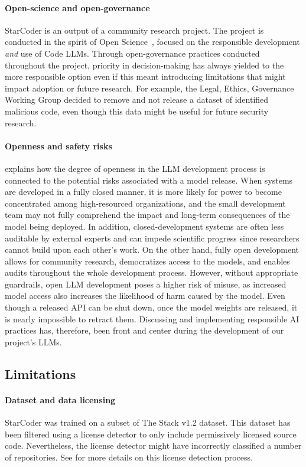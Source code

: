 \paragraph{Open-science and open-governance} StarCoder is an output of a community research project. The project is conducted in the spirit of Open Science~\citep{open-science}, focused on the responsible development \emph{and} use of Code LLMs. Through open-governance practices conducted throughout the project, priority in decision-making has always yielded to the more responsible option even if this meant introducing limitations that might impact adoption or future research. For example, the Legal, Ethics, Governance Working Group decided to remove and not release a dataset of identified malicious code, even though this data might be useful for future security research.

\paragraph{Openness and safety risks}
\citet{solaiman2023gradient} explains how the degree of openness in the LLM development process is connected to the potential risks associated with a model release. When systems are developed in a fully closed manner, it is more likely for power to become concentrated among high-resourced organizations, and the small development team may not fully comprehend the impact and long-term consequences of the model being deployed. In addition, closed-development systems are often less auditable by external experts and can impede scientific progress since researchers cannot build upon each other's work. On the other hand, fully open development allows for community research, democratizes access to the models, and enables audits throughout the whole development process. However, without appropriate guardrails, open LLM development poses a higher risk of misuse, as increased model access also increases the likelihood of harm caused by the model. Even though a released API can be shut down, once the model weights are released, it is nearly impossible to retract them.  Discussing and implementing responsible AI practices has, therefore, been front and center during the  development of our project's LLMs.

\subsection{Limitations}
\paragraph{Dataset and data licensing} StarCoder was trained on a subset of The Stack v1.2 dataset. This dataset has been filtered using a license detector to only include permissively licensed source code. Nevertheless, the license detector might have incorrectly classified a number of repositories. See \citet{Kocetkov2022TheStack} for more details on this license detection process. 

